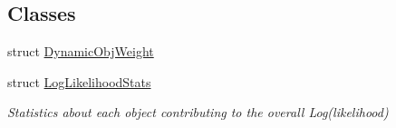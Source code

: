 \subsection*{Classes}
\begin{DoxyCompactItemize}
\item 
struct \mbox{\hyperlink{struct_obj_cryst_1_1_optimization_obj_1_1_dynamic_obj_weight}{Dynamic\+Obj\+Weight}}
\item 
struct \mbox{\hyperlink{struct_obj_cryst_1_1_optimization_obj_1_1_log_likelihood_stats}{Log\+Likelihood\+Stats}}
\begin{DoxyCompactList}\small\item\em Statistics about each object contributing to the overall Log(likelihood) \end{DoxyCompactList}\end{DoxyCompactItemize}
